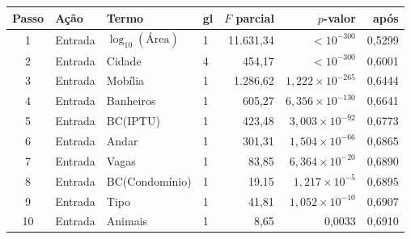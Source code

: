 \begin{tabular}{clllrrr}
\toprule
Passo & Ação & Termo & gl & $F$ parcial & $p$-valor & \Rtwoadj{} após \\
\midrule
1 & Entrada & $\log_{10}(\text{Área})$ & 1 & 11.631,34 & $<10^{-300}$ & 0,5299 \\
2 & Entrada & Cidade & 4 & 454,17 & $<10^{-300}$ & 0,6001 \\
3 & Entrada & Mobília & 1 & 1.286,62 & $1{,}222\times10^{-265}$ & 0,6444 \\
4 & Entrada & Banheiros & 1 & 605,27 & $6{,}356\times10^{-130}$ & 0,6641 \\
5 & Entrada & BC(IPTU) & 1 & 423,48 & $3{,}003\times10^{-92}$ & 0,6773 \\
6 & Entrada & Andar & 1 & 301,31 & $1{,}504\times10^{-66}$ & 0,6865 \\
7 & Entrada & Vagas & 1 & 83,85 & $6{,}364\times10^{-20}$ & 0,6890 \\
8 & Entrada & BC(Condomínio) & 1 & 19,15 & $1{,}217\times10^{-5}$ & 0,6895 \\
9 & Entrada & Tipo & 1 & 41,81 & $1{,}052\times10^{-10}$ & 0,6907 \\
10 & Entrada & Animais & 1 & 8,65 & 0,0033 & 0,6910 \\
\bottomrule
\end{tabular}
